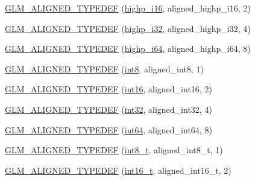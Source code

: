 \begin{DoxyCompactItemize}
\item 
\hyperlink{group__gtx__type__aligned_gae6d384de17588d8edb894fbe06e0d410}{G\+L\+M\+\_\+\+A\+L\+I\+G\+N\+E\+D\+\_\+\+T\+Y\+P\+E\+D\+E\+F} (\hyperlink{group__gtc__type__precision_gaa04399853952dbce29cb62e2432f350a}{highp\+\_\+i16}, aligned\+\_\+highp\+\_\+i16, 2)
\item 
\hyperlink{group__gtx__type__aligned_ga9c8172b745ee03fc5b2b91c350c2922f}{G\+L\+M\+\_\+\+A\+L\+I\+G\+N\+E\+D\+\_\+\+T\+Y\+P\+E\+D\+E\+F} (\hyperlink{group__gtc__type__precision_ga197d19b585222da57d70238a5cfc2be8}{highp\+\_\+i32}, aligned\+\_\+highp\+\_\+i32, 4)
\item 
\hyperlink{group__gtx__type__aligned_ga77e0dff12aa4020ddc3f8cabbea7b2e6}{G\+L\+M\+\_\+\+A\+L\+I\+G\+N\+E\+D\+\_\+\+T\+Y\+P\+E\+D\+E\+F} (\hyperlink{group__gtc__type__precision_gad3cb9a0ac0266ea2c51c6fac256345d1}{highp\+\_\+i64}, aligned\+\_\+highp\+\_\+i64, 8)
\item 
\hyperlink{group__gtx__type__aligned_gabd82b9faa9d4d618dbbe0fc8a1efee63}{G\+L\+M\+\_\+\+A\+L\+I\+G\+N\+E\+D\+\_\+\+T\+Y\+P\+E\+D\+E\+F} (\hyperlink{group__gtc__type__precision_ga96254f9c1c4506fc8eb5cf3301ce8565}{int8}, aligned\+\_\+int8, 1)
\item 
\hyperlink{group__gtx__type__aligned_ga285649744560be21000cfd81bbb5d507}{G\+L\+M\+\_\+\+A\+L\+I\+G\+N\+E\+D\+\_\+\+T\+Y\+P\+E\+D\+E\+F} (\hyperlink{group__gtc__type__precision_ga2945a61d12771f8954994fcddf02b021}{int16}, aligned\+\_\+int16, 2)
\item 
\hyperlink{group__gtx__type__aligned_ga07732da630b2deda428ce95c0ecaf3ff}{G\+L\+M\+\_\+\+A\+L\+I\+G\+N\+E\+D\+\_\+\+T\+Y\+P\+E\+D\+E\+F} (\hyperlink{group__gtc__type__precision_ga632d8b25f6b61659f39ea4321fab92a4}{int32}, aligned\+\_\+int32, 4)
\item 
\hyperlink{group__gtx__type__aligned_ga1a8da2a8c51f69c07a2e7f473aa420f4}{G\+L\+M\+\_\+\+A\+L\+I\+G\+N\+E\+D\+\_\+\+T\+Y\+P\+E\+D\+E\+F} (\hyperlink{group__gtc__type__precision_ga435d75819cce297cc5fa21bd84ef89a5}{int64}, aligned\+\_\+int64, 8)
\item 
\hyperlink{group__gtx__type__aligned_ga848aedf13e2d9738acf0bb482c590174}{G\+L\+M\+\_\+\+A\+L\+I\+G\+N\+E\+D\+\_\+\+T\+Y\+P\+E\+D\+E\+F} (\hyperlink{group__gtc__type__precision_ga673898d450b2a91186f3c4f40c5f8633}{int8\+\_\+t}, aligned\+\_\+int8\+\_\+t, 1)
\item 
\hyperlink{group__gtx__type__aligned_gafd2803d39049dd45a37a63931e25d943}{G\+L\+M\+\_\+\+A\+L\+I\+G\+N\+E\+D\+\_\+\+T\+Y\+P\+E\+D\+E\+F} (\hyperlink{group__gtc__type__precision_gaf89ee61e0d34aa4a462104b7ae7f2da6}{int16\+\_\+t}, aligned\+\_\+int16\+\_\+t, 2)

\end{DoxyCompactItemize}
